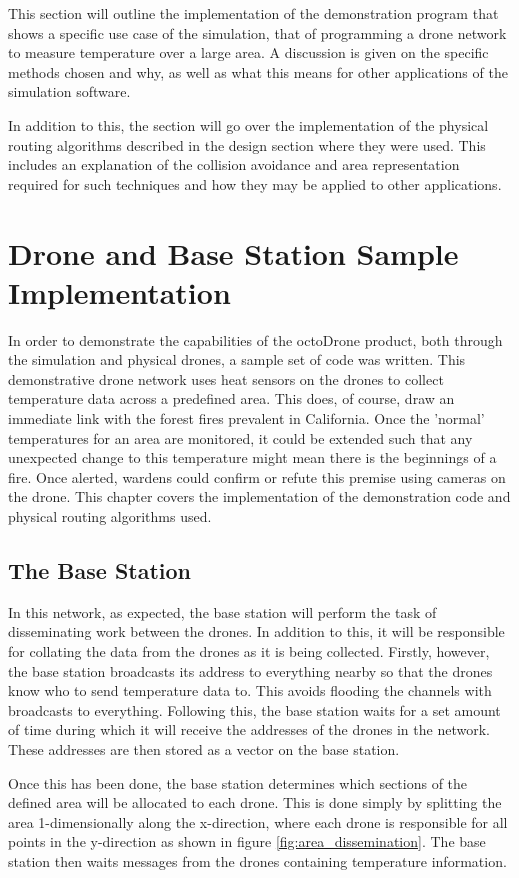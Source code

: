 This section will outline the implementation of the demonstration program that shows a specific use case of the simulation, that of programming a drone network to measure temperature over a large area. A discussion is given on the specific methods chosen and why, as well as what this means for other applications of the simulation software.

In addition to this, the section will go over the implementation of the physical routing algorithms described in the design section where they were used. This includes an explanation of the collision avoidance and area representation required for such techniques and how they may be applied to other applications.

\section{Drone and Base Station Sample Implementation}
In order to demonstrate the capabilities of the octoDrone product, both through the simulation and physical drones, a sample set of code was written. This demonstrative drone network uses heat sensors on the drones to collect temperature data across a predefined area. This does, of course, draw an immediate link with the forest fires prevalent in California. Once the 'normal' temperatures for an area are monitored, it could be extended such that any unexpected change to this temperature might mean there is the beginnings of a fire. Once alerted, wardens could confirm or refute this premise using cameras on the drone. This chapter covers the implementation of the demonstration code and physical routing algorithms used.

\subsection{The Base Station}
In this network, as expected, the base station will perform the task of disseminating work between the drones. In addition to this, it will be responsible for collating the data from the drones as it is being collected. Firstly, however, the base station broadcasts its address to everything nearby so that the drones know who to send temperature data to. This avoids flooding the channels with broadcasts to everything. Following this, the base station waits for a set amount of time during which it will receive the addresses of the drones in the network. These addresses are then stored as a vector on the base station.

Once this has been done, the base station determines which sections of the defined area will be allocated to each drone. This is done simply by splitting the area 1-dimensionally along the x-direction, where each drone is responsible for all points in the y-direction as shown in figure \ref{fig:area_dissemination}. The base station then waits messages from the drones containing temperature information.

